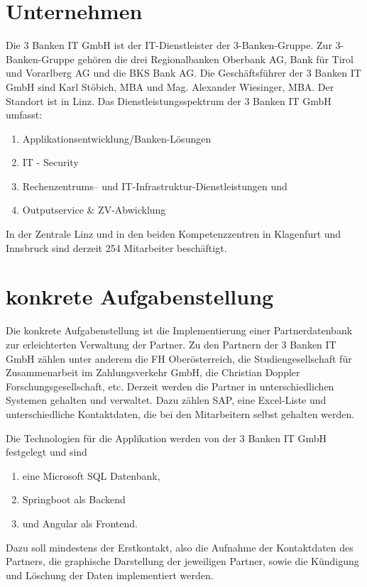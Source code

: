 \documentclass[master,german]{hgbthesis}
\begin{document}
\section{Unternehmen}
Die 3 Banken IT GmbH ist der IT-Dienstleister der 3-Banken-Gruppe. Zur 3-Banken-Gruppe gehören die drei Regionalbanken Oberbank AG, Bank für Tirol und Vorarlberg AG und die BKS Bank AG.
Die Geschäftsführer der 3 Banken IT GmbH sind Karl Stöbich, MBA und Mag. Alexander Wiesinger, MBA. Der Standort ist in Linz.
Das Dienstleistungsspektrum der 3 Banken IT GmbH umfasst:
\begin{enumerate}
	\item Applikationsentwicklung/Banken-Lösungen
	\item IT - Security
	\item Rechenzentrums– und IT-Infrastruktur-Dienstleistungen und
	\item Outputservice \& ZV-Abwicklung
\end{enumerate} 

In der Zentrale Linz und in den beiden Kompetenzzentren in Klagenfurt und Innsbruck sind derzeit 254 Mitarbeiter beschäftigt.
\cite{3BankenIT}

\section{konkrete Aufgabenstellung}
Die konkrete Aufgabenstellung ist die Implementierung einer Partnerdatenbank zur erleichterten Verwaltung der Partner. Zu den Partnern der 3 Banken IT GmbH zählen unter anderem die FH Oberösterreich, die Studiengesellschaft für Zusammenarbeit im Zahlungsverkehr GmbH, die Christian Doppler Forschungsgesellschaft, etc.
Derzeit werden die Partner in unterschiedlichen Systemen gehalten und verwaltet. Dazu zählen SAP, eine Excel-Liste und unterschiedliche Kontaktdaten, die bei den Mitarbeitern selbst gehalten werden.

Die Technologien für die Applikation werden von der 3 Banken IT GmbH festgelegt und sind
\begin{enumerate}
	\item eine Microsoft SQL Datenbank,
	\item Springboot als Backend
	\item und Angular als Frontend.
\end{enumerate}

Dazu soll mindestens der Erstkontakt, also die Aufnahme der Kontaktdaten des Partners, die graphische Darstellung der jeweiligen Partner, sowie die Kündigung und Löschung der Daten implementiert werden.
\end{document}

